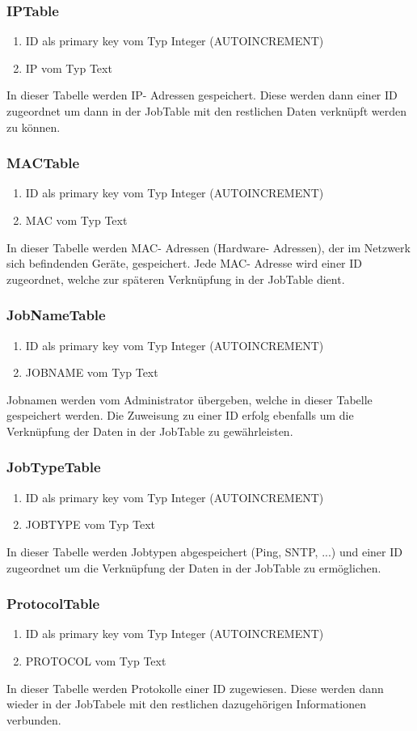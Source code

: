 \documentclass[12pt,a4paper]{report}
\begin{document}
\begin{onehalfspace}
\subsubsection{IPTable}
\begin{enumerate}
\item ID als primary key vom Typ Integer (AUTOINCREMENT)
\item IP vom Typ Text
\end{enumerate}
In dieser Tabelle werden IP- Adressen gespeichert. Diese werden dann einer ID zugeordnet um dann in der JobTable mit den restlichen Daten verknüpft werden zu können.
\subsubsection{MACTable}
\begin{enumerate}
\item ID als primary key vom Typ Integer (AUTOINCREMENT)
\item MAC vom Typ Text
\end{enumerate}
In dieser Tabelle werden MAC- Adressen (Hardware- Adressen), der im Netzwerk sich befindenden Geräte, gespeichert. Jede MAC- Adresse wird einer ID zugeordnet, welche zur späteren Verknüpfung in der JobTable dient.
\subsubsection{JobNameTable}
\begin{enumerate}
\item ID als primary key vom Typ Integer (AUTOINCREMENT)
\item JOBNAME vom Typ Text
\end{enumerate}
Jobnamen werden vom Administrator übergeben, welche in dieser Tabelle gespeichert werden. Die Zuweisung zu einer ID erfolg ebenfalls um die Verknüpfung der Daten in der JobTable zu gewährleisten.
\subsubsection{JobTypeTable}
\begin{enumerate}
\item ID als primary key vom Typ Integer (AUTOINCREMENT)
\item JOBTYPE vom Typ Text
\end{enumerate}
In dieser Tabelle werden Jobtypen abgespeichert (Ping, SNTP, ...) und einer ID zugeordnet um die Verknüpfung der Daten in der JobTable zu ermöglichen.
\subsubsection{ProtocolTable}
\begin{enumerate}
\item ID als primary key vom Typ Integer (AUTOINCREMENT)
\item PROTOCOL vom Typ Text
\end{enumerate}
In dieser Tabelle werden Protokolle einer ID zugewiesen. Diese werden dann wieder in der JobTabele mit den restlichen dazugehörigen Informationen verbunden.

\end{onehalfspace}
\end{document}
